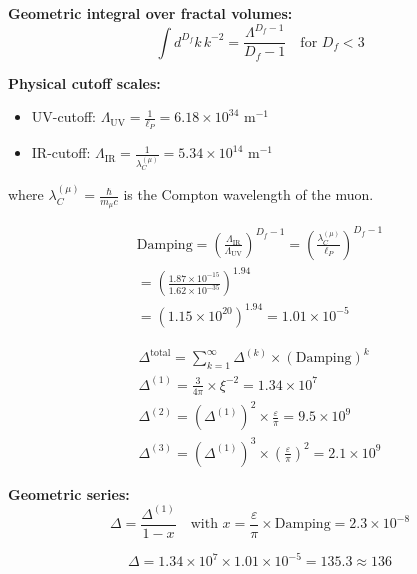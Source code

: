 \documentclass[12pt,a4paper]{article}
\numberwithin{equation}{section}
\newcommand{\xipar}{\xi}
\newcommand{\epsilonT}{\varepsilon}
\newcommand{\Df}{D_f}
\newcommand{\lP}{\ell_P}
\newcommand{\lambdaC}{\lambda_C}
\begin{document}
	\textbf{Geometric integral over fractal volumes:}
	\begin{equation}
		\int d^{\Df}k \, k^{-2} = \frac{\Lambda^{\Df-1}}{\Df-1} \quad \text{for } \Df < 3
		\label{eq:fractal_integral}
	\end{equation}
	
	\textbf{Physical cutoff scales:}
	\begin{itemize}
		\item UV-cutoff: $\Lambda_{\text{UV}} = \frac{1}{\lP} = 6.18 \times 10^{34}$ m$^{-1}$
		\item IR-cutoff: $\Lambda_{\text{IR}} = \frac{1}{\lambdaC^{(\mu)}} = 5.34 \times 10^{14}$ m$^{-1}$
	\end{itemize}
	
	where $\lambdaC^{(\mu)} = \frac{\hbar}{m_\mu c}$ is the Compton wavelength of the muon.
	
	\begin{align}
		\text{Damping} = \left(\frac{\Lambda_{\text{IR}}}{\Lambda_{\text{UV}}}\right)^{\Df-1} = \left(\frac{\lambdaC^{(\mu)}}{\lP}\right)^{\Df-1}\\
		= \left(\frac{1.87 \times 10^{-15}}{1.62 \times 10^{-35}}\right)^{1.94}\\
		= \left(1.15 \times 10^{20}\right)^{1.94} = 1.01 \times 10^{-5}
		\label{eq:damping_factor}
	\end{align}
	
	\begin{align}
		\Delta^{\text{total}} = \sum_{k=1}^{\infty} \Delta^{(k)} \times (\text{Damping})^k\\
		\Delta^{(1)} = \frac{3}{4\pi} \times \xipar^{-2} = 1.34 \times 10^7\\
		\Delta^{(2)} = (\Delta^{(1)})^2 \times \frac{ \epsilonT}{\pi} = 9.5 \times 10^{9}\\
		\Delta^{(3)} = (\Delta^{(1)})^3 \times \left(\frac{ \epsilonT}{\pi}\right)^2 = 2.1 \times 10^{9}
		\label{eq:perturbation_series}
	\end{align}
	
	\textbf{Geometric series:}
	\begin{equation}
		\Delta = \frac{\Delta^{(1)}}{1-x} \quad \text{with } x = \frac{ \epsilonT}{\pi} \times \text{Damping} = 2.3 \times 10^{-8}
		\label{eq:geometric_series}
	\end{equation}
	
	\begin{equation}
		\Delta = 1.34 \times 10^7 \times 1.01 \times 10^{-5} = 135.3 \approx 136
		\label{eq:delta_final}
	\end{equation}
	
\end{document}

